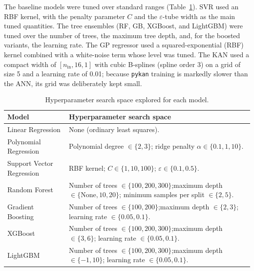\documentclass[journal,article,submit,pdftex,moreauthors]{Definitions/mdpi}
\begin{document}
The baseline models were tuned over standard ranges (Table~\ref{tab:hyperparameters}). SVR used an RBF kernel, with the penalty parameter $C$ and the $\varepsilon$-tube width as the main tuned quantities. The tree ensembles (RF, GB, XGBoost, and LightGBM) were tuned over the number of trees, the maximum tree depth, and, for the boosted variants, the learning rate. The GP regressor used a squared-exponential (RBF) kernel combined with a white-noise term whose level was tuned. The KAN used a compact width of $[n_\mathrm{in}, 16, 1]$ with cubic B-splines (spline order 3) on a grid of size 5 and a learning rate of 0.01; because \texttt{pykan} training is markedly slower than the ANN, its grid was deliberately kept small.

\begin{table}[h]
\centering
\caption{Hyperparameter search space explored for each model.}
\label{tab:hyperparameters}
\begin{tabular}{@{}l p{}@{}}
\hline
\textbf{Model} & \textbf{Hyperparameter search space} \\
\hline
Linear Regression & None (ordinary least squares). \\
Polynomial Regression & Polynomial degree $\in \{2, 3\}$; \newline ridge penalty $\alpha \in \{0.1, 1, 10\}$. \\ \hline 
Support Vector Regression & RBF kernel; $C \in \{1, 10, 100\}$; \newline$\varepsilon \in \{0.1, 0.5\}$. \\ \hline
Random Forest & Number of trees $\in \{100, 200, 300\}$;\newline maximum depth $\in \{\text{None}, 10, 20\}$; \newline minimum samples per split $\in \{2, 5\}$. \\ \hline
Gradient Boosting & Number of trees $\in \{100, 200\}$;\newline maximum depth $\in \{2, 3\}$; \newline learning rate $\in \{0.05, 0.1\}$. \\ \hline
XGBoost & Number of trees $\in \{100, 200, 300\}$;\newline maximum depth $\in \{3, 6\}$; \newline learning rate $\in \{0.05, 0.1\}$. \\ \hline
LightGBM & Number of trees $\in \{100, 200, 300\}$;\newline maximum depth $\in \{-1, 10\}$; \newline learning rate $\in \{0.05, 0.1\}$. \\ \hline

\end{tabular}
\end{table}
\end{document}
